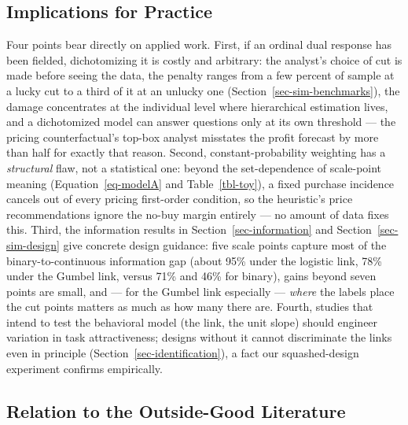 \documentclass[
  letterpaper,
  DIV=11,
  numbers=noendperiod]{scrartcl}
\theoremstyle{plain}
\theoremstyle{plain}
\theoremstyle{remark}
\begin{document}
\subsection{Implications for Practice}\label{implications-for-practice}

Four points bear directly on applied work. First, if an ordinal dual
response has been fielded, dichotomizing it is costly and arbitrary: the
analyst's choice of cut is made before seeing the data, the penalty
ranges from a few percent of sample at a lucky cut to a third of it at
an unlucky one (Section~\ref{sec-sim-benchmarks}), the damage
concentrates at the individual level where hierarchical estimation
lives, and a dichotomized model can answer questions only at its own
threshold --- the pricing counterfactual's top-box analyst misstates the
profit forecast by more than half for exactly that reason. Second,
constant-probability weighting has a \emph{structural} flaw, not a
statistical one: beyond the set-dependence of scale-point meaning
(Equation~\ref{eq-modelA} and Table~\ref{tbl-toy}), a fixed purchase
incidence cancels out of every pricing first-order condition, so the
heuristic's price recommendations ignore the no-buy margin entirely ---
no amount of data fixes this. Third, the information results in
Section~\ref{sec-information} and Section~\ref{sec-sim-design} give
concrete design guidance: five scale points capture most of the
binary-to-continuous information gap (about 95\% under the logistic
link, 78\% under the Gumbel link, versus 71\% and 46\% for binary),
gains beyond seven points are small, and --- for the Gumbel link
especially --- \emph{where} the labels place the cut points matters as
much as how many there are. Fourth, studies that intend to test the
behavioral model (the link, the unit slope) should engineer variation in
task attractiveness; designs without it cannot discriminate the links
even in principle (Section~\ref{sec-identification}), a fact our
squashed-design experiment confirms empirically.

\subsection{Relation to the Outside-Good
Literature}\label{relation-to-the-outside-good-literature}
\end{document}
